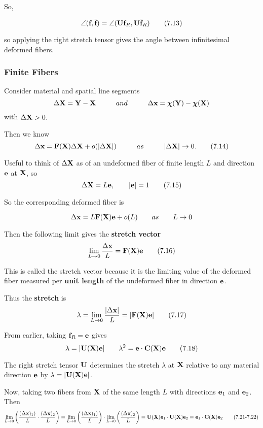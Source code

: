 \documentclass{article}
\newcommand{\Chi}{\boldsymbol{\chi}}
\begin{document}
So,

\[
	\angle(\textbf{f},\bar{\textbf{f}}) = \angle(\textbf{U}\textbf{f}_R,\textbf{U}\bar{\textbf{f}}_R) \tag{7.13} \label{eq:13}
\]

so applying the right stretch tensor gives the angle between infinitesimal deformed fibers.

\subsubsection{Finite Fibers}
Consider material and spatial line segments
\[
	\Delta\X = \Y - \X \hspace{1cm} and \hspace{1cm} \Delta\x = \Chi(\Y) - \Chi(\X)
\]
with $\Delta\textbf{X} > 0.$

Then we know 
\[
	\Delta\textbf{x} = \textbf{F}(\textbf{X})\Delta\textbf{X} + o(|\Delta\textbf{X}|) \hspace{1cm} as \hspace{1cm} |\Delta\textbf{X}| \to 0. \tag{7.14}\label{eq:7.14}
\]

Useful to think of $\Delta\textbf{X}$ as of an undeformed fiber of finite length $L$ and direction $\textbf{e}$ at $\textbf{X}$, so
\[
	\Delta\textbf{X} = L\textbf{e}, \qquad |\textbf{e}| = 1\tag{7.15}\label{eq:7.15}
\]

So the corresponding deformed fiber is

\[
	\Delta\textbf{x} = L\textbf{F}(\textbf{X})\textbf{e} + o(L) \qquad as \qquad L\to 0
\]

Then the following limit gives the \textbf{stretch vector}
\[
	\lim\limits_{L\to 0}\frac{\Delta\textbf{x}}{L} = \textbf{F}(\textbf{X})\textbf{e}\tag{7.16}\label{eq:7.16}
\]

This is called the stretch vector because it is the limiting value of the deformed fiber measured per \textbf{unit length} of the undeformed fiber in direction $\textbf{e}$.

Thus the \textbf{stretch} is
\[
	\lambda = \lim\limits_{L\to 0}\frac{|\Delta\textbf{x}|}{L} = |\textbf{F}(\textbf{X})\textbf{e}|\tag{7.17}\label{eq:17}
\]

From earlier, taking $\textbf{f}_R=\textbf{e}$ gives
\[
	\lambda = |\textbf{U}(\textbf{X})\textbf{e}| \qquad \lambda^2 = \textbf{e}\cdot\textbf{C}(\textbf{X})\textbf{e}\tag{7.18}\label{eq:7.18}
\]
\begin{remark}
	The right stretch tensor $\textbf{U}$ determines the stretch $\lambda$ at $\textbf{X}$ relative to any material direction $\textbf{e}$ by $\lambda = |\textbf{U}(\textbf{X})\textbf{e}|$.
\end{remark}

Now, taking two fibers from $\textbf{X}$ of the same length $L$ with directions $\textbf{e}_1$ and $\textbf{e}_2$.
Then
\[
	\lim\limits_{L\to 0} \left( \frac{(\Delta\textbf{x})_1)}{L} \cdot \frac{(\Delta\textbf{x})_2}{L} \right)
	= \lim\limits_{L\to 0} \left( \frac{(\Delta\textbf{x})_1)}{L} \right) \cdot \lim\limits_{L\to 0} \left( \frac{(\Delta\textbf{x})_2}{L} \right)
	= \textbf{U}(\textbf{X})\textbf{e}_1\cdot\textbf{U}(\textbf{X})\textbf{e}_2
	= \textbf{e}_1\cdot\textbf{C}(\textbf{X})\textbf{e}_2 \tag{7.21-7.22}\label{eq:7.21}
\]
\end{document}
